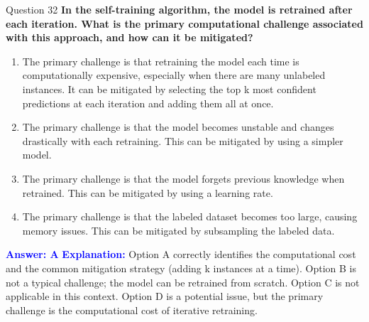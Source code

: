 \documentclass[8pt]{beamer}  %
\begin{document}
	\begin{frame}{Question 32}
		\textbf{In the self-training algorithm, the model is retrained after each iteration. What is the primary computational challenge associated with this approach, and how can it be mitigated?}
		\begin{enumerate}
			\item The primary challenge is that retraining the model each time is computationally expensive, especially when there are many unlabeled instances. It can be mitigated by selecting the top k most confident predictions at each iteration and adding them all at once.
			\item The primary challenge is that the model becomes unstable and changes drastically with each retraining. This can be mitigated by using a simpler model.
			\item The primary challenge is that the model forgets previous knowledge when retrained. This can be mitigated by using a learning rate.
			\item The primary challenge is that the labeled dataset becomes too large, causing memory issues. This can be mitigated by subsampling the labeled data.
		\end{enumerate}
		\vspace{0.2cm}
		\textcolor{blue}{\textbf{Answer: A}}
		\vspace{0.2cm}
		\textcolor{blue}{\textbf{Explanation:}} Option A correctly identifies the computational cost and the common mitigation strategy (adding k instances at a time). Option B is not a typical challenge; the model can be retrained from scratch. Option C is not applicable in this context. Option D is a potential issue, but the primary challenge is the computational cost of iterative retraining.
	\end{frame}
	
\end{document}

